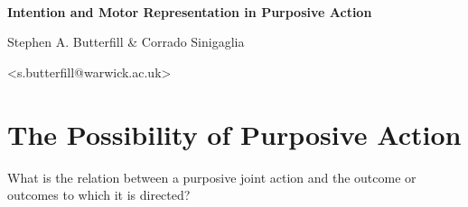 \documentclass[11pt]{extarticle}
\date{}
\begin{document}
\begin{multicols}{3}

\setlength\footnotesep{1em}






\

\begin{center}
{\Large
\textbf{Intention and Motor Representation in Purposive Action}
}


Stephen A. Butterfill \& Corrado Sinigaglia

<s.butterfill@warwick.ac.uk>

\end{center}




\section{The Possibility of Purposive Action}
What is the relation between a purposive joint action and the outcome or outcomes to which it is directed?



\end{multicols}
\end{document}
